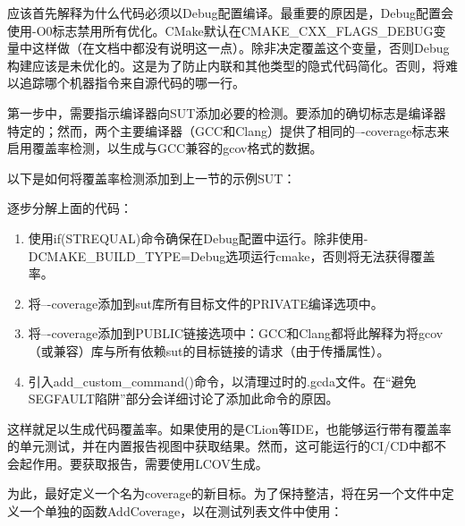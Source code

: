 应该首先解释为什么代码必须以Debug配置编译。最重要的原因是，Debug配置会使用-O0标志禁用所有优化。CMake默认在CMAKE\_CXX\_FLAGS\_DEBUG变量中这样做（在文档中都没有说明这一点）。除非决定覆盖这个变量，否则Debug构建应该是未优化的。这是为了防止内联和其他类型的隐式代码简化。否则，将难以追踪哪个机器指令来自源代码的哪一行。

第一步中，需要指示编译器向SUT添加必要的检测。要添加的确切标志是编译器特定的；然而，两个主要编译器（GCC和Clang）提供了相同的–{}-coverage标志来启用覆盖率检测，以生成与GCC兼容的gcov格式的数据。

以下是如何将覆盖率检测添加到上一节的示例SUT：



逐步分解上面的代码：

\begin{enumerate}
\item
使用if(STREQUAL)命令确保在Debug配置中运行。除非使用-DCMAKE\_BUILD\_TYPE=Debug选项运行cmake，否则将无法获得覆盖率。

\item
将–{}-coverage添加到sut库所有目标文件的PRIVATE编译选项中。

\item
将–{}-coverage添加到PUBLIC链接选项中：GCC和Clang都将此解释为将gcov（或兼容）库与所有依赖sut的目标链接的请求（由于传播属性）。

\item
引入add\_custom\_command()命令，以清理过时的.gcda文件。在“避免SEGFAULT陷阱”部分会详细讨论了添加此命令的原因。
\end{enumerate}

这样就足以生成代码覆盖率。如果使用的是CLion等IDE，也能够运行带有覆盖率的单元测试，并在内置报告视图中获取结果。然而，这可能运行的CI/CD中都不会起作用。要获取报告，需要使用LCOV生成。

为此，最好定义一个名为coverage的新目标。为了保持整洁，将在另一个文件中定义一个单独的函数AddCoverage，以在测试列表文件中使用：

